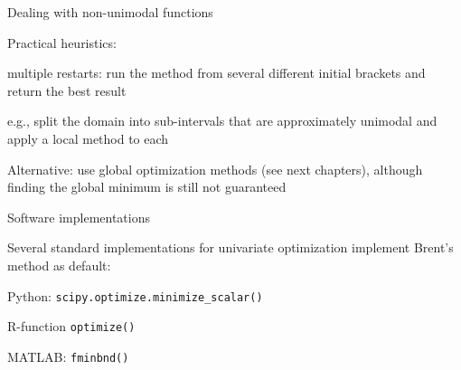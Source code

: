 \documentclass[11pt,compress,t,notes=noshow, xcolor=table]{beamer}
\begin{document}
\begin{framei}[sep=L]{Dealing with non-unimodal functions}
\item Practical heuristics:
\begin{itemizeM}
\item multiple restarts: run the method from several different initial brackets and return the best result
\item e.g., split the domain into sub-intervals that are approximately unimodal and apply a local method to each
\end{itemizeM}
\item Alternative: use global optimization methods (see next chapters), although finding the global minimum is still not guaranteed
\end{framei}


\begin{framei}[sep=L]{Software implementations}
\item Several standard implementations for univariate optimization implement Brent's method as default:

\begin{itemizeL}
\item Python: \texttt{scipy.optimize.minimize\_scalar()}
\item R-function \texttt{optimize()}
\item MATLAB: \texttt{fminbnd()}
\end{itemizeL}
\end{framei}


\endlecture
\end{document}
